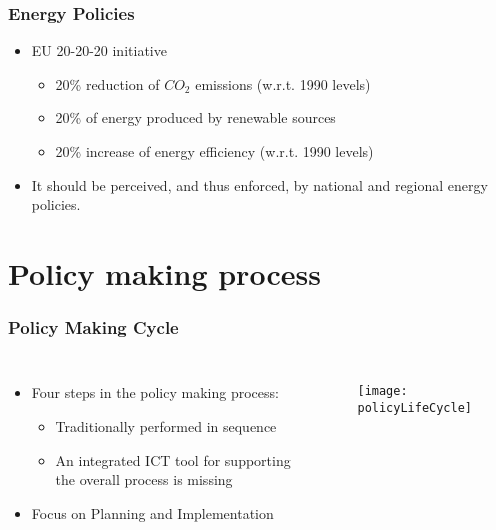 \documentclass{beamer}
\begin{document}
 	\begin{frame}
	\frametitle{Energy Policies}
		\begin{itemize}
			\item EU 20-20-20 initiative
			\begin{itemize}
				\item 20\% reduction of $CO_2$ emissions (w.r.t. 1990 levels)
				\item 20\% of energy produced by renewable sources
				\item 20\% increase of energy efficiency (w.r.t. 1990 levels) 
			\end{itemize}
			\item It should be perceived, and thus enforced, by	national and regional energy policies.
		\end{itemize}
 	\end{frame}
 	
\section{Policy making process}
	\begin{frame}
	\frametitle{Policy Making Cycle}
		\begin{columns}
			\begin{itemize}
				\item Four steps in the policy making process: 
				\begin{itemize}
					\item Traditionally performed in sequence
					\item An integrated ICT tool for supporting the overall process is missing   
				\end{itemize}
				\item Focus on Planning and Implementation
			\end{itemize}
			\begin{figure}[hbt]
				\centering
				\texttt{[image: policyLifeCycle]}
				\label{epolicyLifeCycle}
			\end{figure}
		\end{columns}
 	\end{frame}
 	
\end{document}
